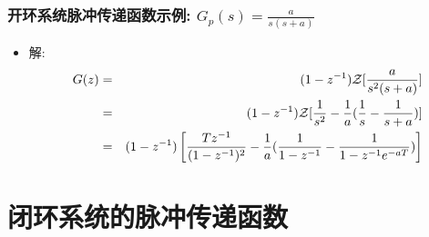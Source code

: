 \documentclass[table]{beamer}
\begin{document}
\begin{frame}
\frametitle{开环系统脉冲传递函数示例:  $G_p(s)=\frac{a}{s(s+a)}$}
\label{sec-3-4}

\begin{itemize}
\item <2->解:
     \begin{eqnarray*}
     G(z) & = &(1-z^{-1}){\cal Z}[\frac{a}{s^2(s+a)}] \\
      &=& (1-z^{-1}){\cal Z}[\frac{1}{s^2}-\frac{1}{a}(\frac{1}{s}-\frac{1}{s+a})] \\
      &=& (1-z^{-1})\left[\frac{Tz^{-1}}{(1-z^{-1})^2}-\frac{1}{a}(\frac{1}{1-z^{-1}}-\frac{1}{1-z^{-1}e^{-aT}} )\right]
     \end{eqnarray*}
\end{itemize}
\end{frame}
\section{闭环系统的脉冲传递函数}
\label{sec-4}
\end{document}

